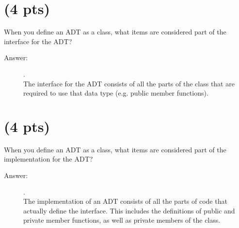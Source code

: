 \documentclass[11pt]{article}
\begin{document}
\section{(4 pts)}
\label{sec:orgec4222c}

When you define an ADT as a class, what items are considered part of
the interface for the ADT?
\begin{description}
    \item[Answer:] .\\
    The interface for the ADT consists of all the parts of the class that are required to use that data type (e.g. public member functions).
\end{description}

\section{(4 pts)}
\label{sec:orgb376198}

When you define an ADT as a class, what items are considered part of
the implementation for the ADT?
\begin{description}
    \item[Answer:] .\\
    The implementation of an ADT consists of all the parts of code that actually define the interface. This includes the definitions of public and private member functions, as well as private members of the class.
\end{description}
\end{document}
